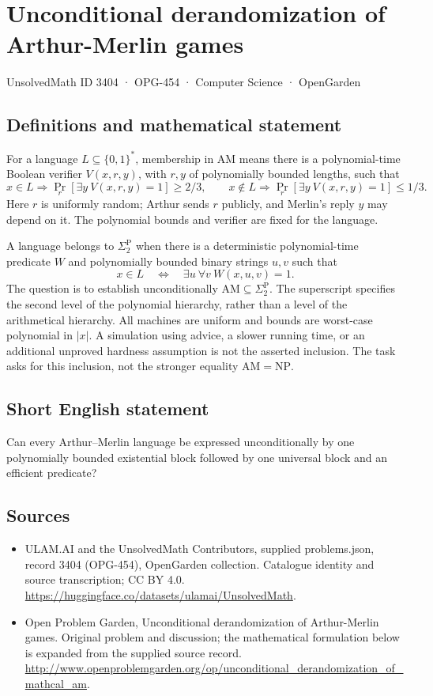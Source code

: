 \documentclass[11pt,a4paper]{article}
\begin{document}
\section*{Unconditional derandomization of Arthur-Merlin games}\label{3404}
{\small UnsolvedMath ID 3404 · OPG-454 · Computer Science · OpenGarden}
\subsection{Definitions and mathematical statement}
For a language $L\subseteq\{0,1\}^*$, membership in $\mathrm{AM}$
means there is a polynomial-time Boolean verifier $V(x,r,y)$,
with $r,y$ of polynomially bounded lengths, such that
\[
 x\in L\Rightarrow\Pr_r[\exists y\ V(x,r,y)=1]\ge2/3,
 \qquad
 x\notin L\Rightarrow\Pr_r[\exists y\ V(x,r,y)=1]\le1/3.
\]
Here $r$ is uniformly random; Arthur sends $r$ publicly, and Merlin's
reply $y$ may depend on it. The polynomial bounds and verifier are
fixed for the language.

A language belongs to $\Sigma_2^{\mathrm P}$ when there is a
deterministic polynomial-time predicate $W$ and polynomially bounded
binary strings $u,v$ such that
\[
             x\in L\quad\Longleftrightarrow\quad
                         \exists u\ \forall v\ W(x,u,v)=1.
\]
The question is to establish unconditionally
$\mathrm{AM}\subseteq\Sigma_2^{\mathrm P}$.
The superscript specifies the second level of the polynomial
hierarchy, rather than a level of the arithmetical hierarchy.
All machines are uniform and bounds are worst-case polynomial in
$|x|$. A simulation using advice, a slower running time, or an
additional unproved hardness assumption is not the asserted inclusion.
The task asks for this inclusion, not the stronger equality
$\mathrm{AM}=\mathrm{NP}$.
\subsection{Short English statement}
Can every Arthur–Merlin language be expressed unconditionally by one polynomially bounded existential block followed by one universal block and an efficient predicate?
\subsection{Sources}
\begin{itemize}
\item[S1] ULAM.AI and the UnsolvedMath Contributors, supplied problems.json, record 3404 (OPG-454), OpenGarden collection. Catalogue identity and source transcription; CC BY 4.0.
\url{https://huggingface.co/datasets/ulamai/UnsolvedMath}.
\item[S2] Open Problem Garden, Unconditional derandomization of Arthur-Merlin games. Original problem and discussion; the mathematical formulation below is expanded from the supplied source record.
\url{http://www.openproblemgarden.org/op/unconditional_derandomization_of_mathcal_am}.
\end{itemize}
\end{document}
